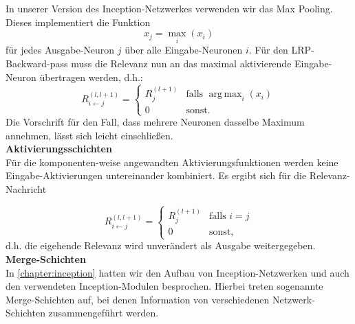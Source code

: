 \documentclass[11pt,a4paper]{article}
\DeclareMathOperator*{\argmax}{arg\,max}
\numberwithin{equation}{section}
\begin{document}
	In unserer Version des Inception-Netzwerkes verwenden wir das Max Pooling. Dieses implementiert die Funktion
	\begin{equation}
		x_j = \max_i{(x_i)}
	\end{equation}
	für jedes Ausgabe-Neuron $j$ über alle Eingabe-Neuronen $i$. Für den LRP-Backward-pass muss die Relevanz nun an das maximal aktivierende Eingabe-Neuron übertragen werden, d.h.:
	\begin{equation}
	R_{i \leftarrow j}^{(l,l+1)} = \begin{cases}
	R_j^{(l+1)} & \text{falls  }\argmax_i{(x_i)}\\
	0			& \text{sonst.}
	\end{cases}
	\end{equation}
	Die Vorschrift für den Fall, dass mehrere Neuronen dasselbe Maximum annehmen, lässt sich leicht einschließen.\\
	
	
	\noindent\textbf{Aktivierungsschichten}\\
	Für die komponenten-weise angewandten Aktivierungsfunktionen werden keine Eingabe-Aktivierungen untereinander kombiniert. Es ergibt sich für die Relevanz-Nachricht
	
	\begin{equation}
		R_{i\leftarrow j}^{(l,l+1)} = \begin{cases}
		R_j^{(l+1)} & \text{falls  } i=j\\
		0 &\text{sonst,}
		\end{cases}
	\end{equation} d.h. die eigehende Relevanz wird unverändert als Ausgabe weitergegeben.\\
	
	
	
	\noindent\textbf{Merge-Schichten}\\
	In \autoref{chapter:inception} hatten wir den Aufbau von Inception-Netzwerken und auch den verwendeten Inception-Modulen besprochen. Hierbei treten sogenannte Merge-Schichten auf, bei denen Information von verschiedenen Netzwerk-Schichten zusammengeführt werden.
	
\end{document}
